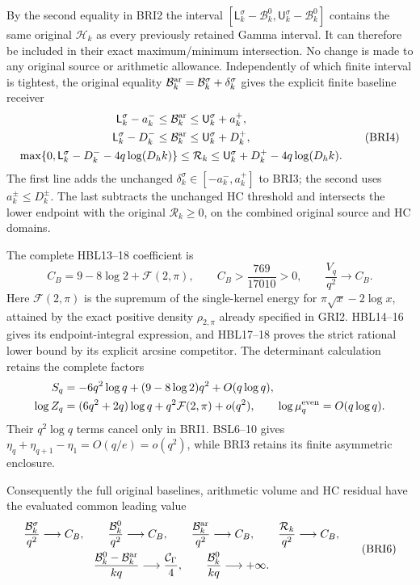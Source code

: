 \documentclass[11pt,a4paper]{article}
\begin{document}
By the second equality in BRI2 the interval
$[\mathsf L_k^\sigma-\mathcal B_k^0,
\mathsf U_k^\sigma-\mathcal B_k^0]$ contains the same original
$\mathcal H_k$ as every previously retained Gamma interval.
It can therefore be included in their exact maximum/minimum
intersection. No change is made to any original source or
arithmetic allowance. Independently of which finite interval is
tightest, the original equality
$\mathcal B_k^{\rm ar}=\mathcal B_k^\sigma+\delta_k^\sigma$
gives the explicit finite baseline receiver
\[
\begin{gathered}
 \mathsf L_k^\sigma-a_k^-\leq\mathcal B_k^{\rm ar}
                                   \leq\mathsf U_k^\sigma+a_k^+,\\
 \mathsf L_k^\sigma-D_k^-\leq\mathcal B_k^{\rm ar}
                                   \leq\mathsf U_k^\sigma+D_k^+,\\
 \max\{0,\mathsf L_k^\sigma-D_k^- -4q\log(D_hk)\}
 \leq\mathcal R_k
 \leq\mathsf U_k^\sigma+D_k^+ -4q\log(D_hk).
\end{gathered}\tag{BRI4}
\]
The first line adds the unchanged
$\delta_k^\sigma\in[-a_k^-,a_k^+]$ to BRI3; the second
uses $a_k^\pm\leq D_k^\pm$. The last subtracts the unchanged
HC threshold and intersects the lower endpoint with the original
$\mathcal R_k\geq0$, on the combined original source and HC domains.

The complete HBL13--18 coefficient is
\[
 C_B=9-8\log2+\mathcal F(2,\pi),\qquad
 C_B>\frac{769}{17010}>0,\qquad
 \frac{V_q}{q^2}\longrightarrow C_B.
 \tag{BRI5}
\]
Here $\mathcal F(2,\pi)$ is the supremum of the single-kernel
energy for $\pi\sqrt x-2\log x$, attained by the exact positive
density $\rho_{2,\pi}$ already specified in GRI2. HBL14--16
gives its endpoint-integral expression, and HBL17--18 proves
the strict rational lower bound by its explicit arcsine competitor.
The determinant calculation retains the complete factors
\[
\begin{split}
 S_q&=-6q^2\log q+(9-8\log2)q^2+O(q\log q),\\
 \log Z_q&=(6q^2+2q)\log q+q^2\mathcal F(2,\pi)+o(q^2),\qquad
 \log\mu_q^{\rm even}=O(q\log q).
\end{split}
\]
Their $q^2\log q$ terms cancel only in BRI1. BSL6--10 gives
$\eta_q+\eta_{q+1}-\eta_1=O(q/e)=o(q^2)$, while BRI3
retains its finite asymmetric enclosure.

Consequently the full original baselines, arithmetic volume and
HC residual have the evaluated common leading value
\[
\begin{gathered}
 \frac{\mathcal B_k^\sigma}{q^2}\longrightarrow C_B,\qquad
 \frac{\mathcal B_k^0}{q^2}\longrightarrow C_B,\qquad
 \frac{\mathcal B_k^{\rm ar}}{q^2}\longrightarrow C_B,\qquad
 \frac{\mathcal R_k}{q^2}\longrightarrow C_B,\\
 \frac{\mathcal B_k^0-\mathcal B_k^{\rm ar}}{kq}
                \longrightarrow\frac{\mathcal C_\Gamma}{4},
 \qquad \frac{\mathcal B_k^0}{kq}\longrightarrow+\infty.
\end{gathered}\tag{BRI6}
\]
\end{document}
